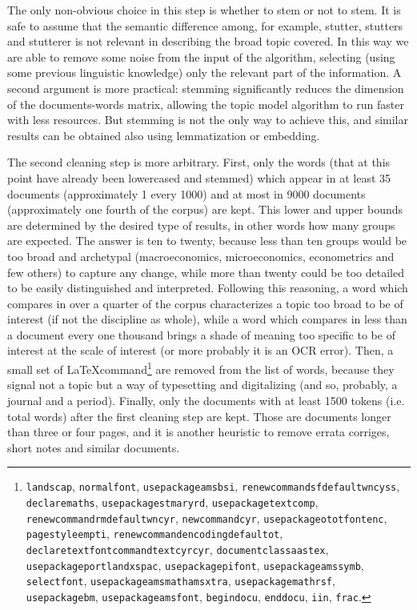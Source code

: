 \documentclass[a4paper, 11pt, headings=standardclasses, tablecaptionsbelow]{scrartcl}
\begin{document}
The only non-obvious choice in this step is whether to stem or not to stem. It is safe to assume that the semantic difference among, for example, stutter, stutters and stutterer is not relevant in describing the broad topic covered. In this way we are able to remove some noise from the input of the algorithm, selecting (using some previous linguistic knowledge) only the relevant part of the information. A second argument is more practical: stemming significantly reduces the dimension of the documents-words matrix, allowing the topic model algorithm to run faster with less resources.
But stemming is not the only way to achieve this, and similar results can be obtained also using lemmatization or embedding.

The second cleaning step is more arbitrary.
First, only the words (that at this point have already been lowercased and stemmed) which appear in at least 35 documents (approximately 1 every 1000) and at most in 9000 documents (approximately one fourth of the corpus) are kept. This lower and upper bounds are determined by the desired type of results, in other words how many groups are expected. The answer is ten to twenty, because less than ten groups would be too broad and archetypal (macroeconomics, microeconomics, econometrics and few others) to capture any change, while more than twenty could be too detailed to be easily distinguished and interpreted. Following this reasoning, a word which compares in over a quarter of the corpus characterizes a topic too broad to be of interest (if not the discipline as whole), while a word which compares in less than a document every one thousand brings a shade of meaning too specific to be of interest at the scale of interest (or more probably it is an OCR error). Then, a small set of \LaTeX command\footnote{\texttt{landscap}, \texttt{normalfont}, \texttt{usepackageamsbsi}, \texttt{renewcommandsfdefaultwncyss}, \texttt{declaremaths}, \texttt{usepackagestmaryrd}, \texttt{usepackagetextcomp}, \texttt{renewcommandrmdefaultwncyr}, \texttt{newcommandcyr}, \texttt{usepackageototfontenc}, \texttt{pagestyleempti}, \texttt{renewcommandencodingdefaultot}, \texttt{declaretextfontcommandtextcyrcyr}, \texttt{documentclassaastex}, \texttt{usepackageportlandxspac}, \texttt{usepackagepifont}, \texttt{usepackageamssymb}, \texttt{selectfont}, \texttt{usepackageamsmathamsxtra}, \texttt{usepackagemathrsf}, \texttt{usepackagebm}, \texttt{usepackageamsfont}, \texttt{begindocu}, \texttt{enddocu}, \texttt{iin}, \texttt{frac}.} are removed from the list of words, because they signal not a topic but a way of typesetting and digitalizing (and so, probably, a journal and a period).
Finally, only the documents with at least 1500 tokens (i.e. total words) after the first cleaning step are kept. Those are documents longer than three or four pages, and it is another heuristic to remove errata corriges, short notes and similar documents.
\end{document}
